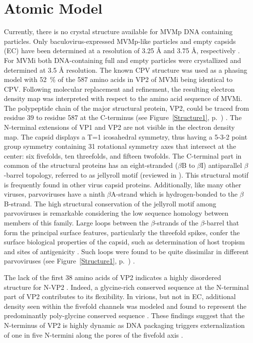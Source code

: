 \section{Atomic Model}
\label{Structure}
Currently, there is no crystal structure available for MVMp DNA containing particles. Only baculovirus-expressed MVMp-like particles and empty capsids (EC) have been determined at a resolution of 3.25 \r{A} and 3.75 \r{A}, respectively \cite{pmid16103145}. For MVMi both DNA-containing full and empty particles were crystallized and determined at 3.5 \r{A} resolution. The known CPV structure \cite{pmid3379641} was used as a phasing model with 52~\% of the 587 amino acids in VP2 of MVMi being identical to CPV. Following molecular replacement and refinement, the resulting electron density map was interpreted with respect to the amino acid sequence of MVMi. The polypeptide chain of the major structural protein, VP2, could be traced from residue 39 to residue 587 at the C-terminus (see Figure~\ref{Structure1}, p.~\pageref{Structure1}) \cite{pmid15299974}. The N-terminal extensions of VP1 and VP2 are not visible in the electron density map. The capsid displays a T=1 icosahedral symmetry, thus having a 5-3-2 point group symmetry containing 31 rotational symmetry axes that intersect at the center: six fivefolds, ten threefolds, and fifteen twofolds. The C-terminal part in common of the structural proteins has an eight-stranded ($\beta$B to $\beta$I) antiparallel $\beta$-barrel topology, referred to as jellyroll motif (reviewed in \cite{pmid2673017, Fundamental_Virology}). This structural motif is frequently found in other virus capsid proteins. Additionally, like many other viruses, parvoviruses have a ninth $\beta$A-strand which is hydrogen-bonded to the $\beta$B-strand. The high structural conservation of the jellyroll motif among parvoviruses is remarkable considering the low sequence homology between members of this family. Large loops between the $\beta$-strands of the $\beta$-barrel that form the principal surface features, particularly the threefold spikes, confer the surface biological properties of the capsid, such as determination of host tropism \cite{pmid1316457, pmid3942033} and sites of antigenicity \cite{pmid8985402, pmid1942246}. Such loops were found to be quite dissimilar in different parvoviruses (see Figure~\ref{Structure1}, p.~\pageref{Structure1}) \cite{pmid8503170}. 

The lack of the first 38 amino acids of VP2 indicates a highly disordered structure for N-VP2 \cite{pmid15299974}. Indeed, a glycine-rich conserved sequence at the N-terminal part of VP2 contributes to its flexibility. In virions, but not in EC, additional density seen within the fivefold channels was modeled and found to represent the predominantly poly-glycine conserved sequence \cite{pmid15299494, pmid8969301}. These findings suggest that the N-terminus of VP2 is highly dynamic as DNA packaging triggers externalization of one in five N-termini along the pores of the fivefold axis \cite{pmid9817841}.
 
